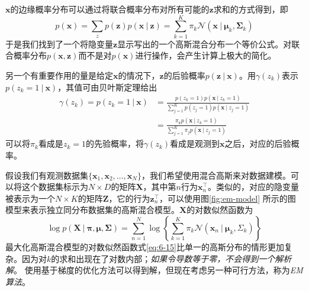 \documentclass[11pt]{ctexbook}
\begin{document}
$\bm x $的边缘概率分布可以通过将联合概率分布对所有可能的$\bm z$求和的方式得到，即
\begin{equation}
	p(\bm x) = \sum_z p(\bm z)p(\bm x \ |\ \bm z) = \sum_{k=1}^{K}\pi_k \mathcal N(\bm x \ |\ \bm \mu_k, \bm \Sigma_k)
\end{equation}
于是我们找到了一个将隐变量$\bm z$显示写出的一个高斯混合分布一个等价公式。对联合概率分布$p(\bm x, \bm z)$而不是对$p(\bm x)$进行操作，会产生计算上极大的简化。

另一个有重要作用的量是给定$\bm x$的情况下，$\bm z$的后验概率$p(\bm z\ |\ \bm x)$。用$\mathcal \gamma(z_k)$表示$p(z_k=1\ |\ \bm x)$，其值可由贝叶斯定理给出
\begin{align}
	\gamma(z_k) = p(z_k=1\ |\ \bm x) &= \frac{p(z_k=1)p(\bm x\ |\ z_k=1)}{\sum_{j=1}^{K}p(z_j=1)p(\bm x\ |\ z_j=1)} \\
									 &= \frac{\pi_k p(\bm x\ |\ z_k=1)}{\sum_{j=1}^{K}\pi_j p(\bm x\ |\ z_j=1)} 
\end{align}
可以将$\pi_k$看成是$z_k=1$的先验概率，将$\gamma(z_k)$看成是观测到$\bm x$之后，对应的后验概率。

假设我们有观测数据集$\{\bm x_1, \bm x_2, \ldots, \bm x_N\}$，我们希望使用混合高斯来对数据建模。可以将这个数据集标示为$N\times D$的矩阵$\bm X$，其中第$n$行为$\bm x_n^\top$。类似的，对应的隐变量被表示为一个$N\times K$的矩阵$\bm Z$，它的行为$\bm z_n^\top$，可以使用图\ref{fig:em-model} 所示的图模型来表示独立同分布数据集的高斯混合模型。$\bm X$的对数似然函数为
\begin{equation}
	\label{eq:6-15}
	\log p(\bm X\ |\ \bm \pi, \bm \mu, \bm \Sigma)=\sum_{n=1}^{N}\log\left\{ \sum_{k=1}^{K}\pi_k\mathcal N(\bm x_n\ |\ \bm \mu_k, \Sigma_k) \right\}
\end{equation}
最大化高斯混合模型的对数似然函数式\ref{eq:6-15}比单一的高斯分布的情形更加复杂。因为对$k$的求和出现在了对数内部；\emph{如果令导数等于零，不会得到一个解析解}。
使用基于梯度的优化方法可以得到解，但现在考虑另一种可行方法，称为\emph{EM算法}。
\end{document}
